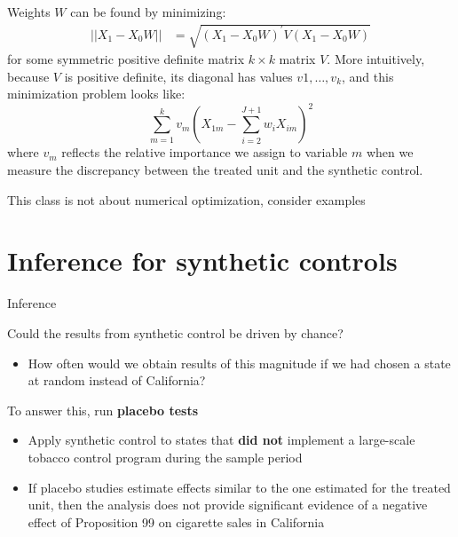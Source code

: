 \documentclass[compress, 8pt]{beamer}
\begin{document}
\begin{frame}{}

Weights $W$ can be found by minimizing:
\begin{align*}
    \vert \vert X_1 - X_0 W \vert \vert 
    &= \sqrt{
        (X_1 - X_0 W)^\prime V (X_1 - X_0 W)
    }
\end{align*}
for some symmetric positive definite matrix $k \times k$ matrix $V$. More intuitively, because $V$ is positive definite, its diagonal has values $v1, \dots, v_k$, and this minimization problem looks like:
\begin{equation*}
    \sum_{m=1}^k v_m \left(X_{1m} - \sum_{i=2}^{J+1} w_i X_{im} \right)^2
\end{equation*}
where $v_m$ reflects the relative importance we assign to variable $m$ when we measure the discrepancy between the treated unit and the synthetic control.

\vspace{3ex}
This class is not about numerical optimization, consider examples 

\end{frame}


\section[Inference]{Inference for synthetic controls}
\miniframesoff
\begin{frame}
    \tableofcontents[currentsection]
\end{frame}
\miniframeson



\begin{frame}{Inference}

Could the results from synthetic control be driven by chance?
\begin{itemize}
    \item How often would we obtain results of this magnitude if we had chosen a state at random instead of California?
\end{itemize}

\vspace{3ex}
To answer this, run \textbf{placebo tests}
\begin{itemize}
    \item Apply synthetic control to states that \textbf{did not} implement a large-scale tobacco control program during the sample period

    \item If placebo studies estimate effects similar to the one estimated for the treated unit, then the analysis does not provide significant evidence of a negative effect of Proposition 99 on cigarette sales in California
\end{itemize}

\end{frame}
\end{document}
